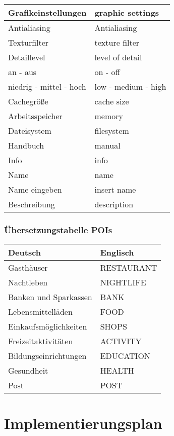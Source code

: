\documentclass[10pt]{scrreprt}
\begin{document}
\begin{tabular}{|p{7.5cm}|p{7.5cm}|}
\hline
Grafikeinstellungen & graphic settings \\
\hline
Antialiasing & Antialiasing \\
\hline
Texturfilter & texture filter \\
\hline
Detaillevel & level of detail \\
\hline
an - aus & on - off \\
\hline
niedrig - mittel - hoch & low - medium - high\\
\hline
Cachegröße & cache size \\
\hline
Arbeitsspeicher & memory \\
\hline
Dateisystem & filesystem \\
\hline
Handbuch & manual \\
\hline
Info & info \\
\hline
Name & name \\
\hline
Name eingeben & insert name \\
\hline
Beschreibung & description \\
\hline
\end{tabular}

\vspace{1.5 cm}
\subsection{Übersetzungstabelle POIs}
\begin{tabular}{|p{7.5cm}|p{7.5cm}|}
\hline 
\textbf{Deutsch} & \textbf{Englisch} \\ 
\hline
\hline 
Gasthäuser & RESTAURANT \\ 
\hline
Nachtleben & NIGHTLIFE \\ 
\hline
Banken und Sparkassen & BANK \\ 
\hline
Lebensmittelläden & FOOD \\ 
\hline
Einkaufsmöglichkeiten & SHOPS \\ 
\hline
Freizeitaktivitäten & ACTIVITY \\ 
\hline
Bildungseinrichtungen & EDUCATION \\
\hline
Gesundheit & HEALTH \\
\hline
Post & POST \\ 
\hline
\end{tabular}

\chapter*{Implementierungsplan}
\end{document}
